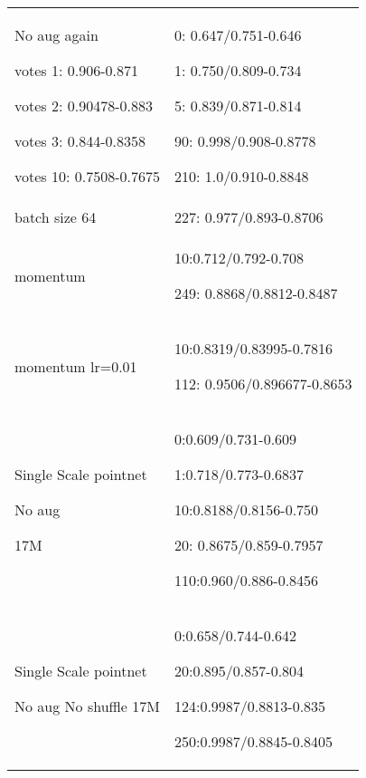 \documentclass[,table,dvipsnames]{article}
\begin{document}
\begin{tabular}{|p{10cm}|p{5.5cm}| }
	\rowcolor{orange!20}
	No aug again\par
	votes 1: 0.906-0.871\par votes 2: 0.90478-0.883\par votes 3: 0.844-0.8358\par votes 10: 0.7508-0.7675
	&0: 0.647/0.751-0.646\par 1: 0.750/0.809-0.734\par 5: 0.839/0.871-0.814\par 90: 0.998/0.908-0.8778\par 210: 1.0/0.910-0.8848
	\\

	\rowcolor{green!20}
	batch size 64 & 227: 0.977/0.893-0.8706\\
	
	\rowcolor{yellow!20}
	momentum & 10:0.712/0.792-0.708\par 249: 0.8868/0.8812-0.8487\\
	
	\rowcolor{green!20}
	momentum lr=0.01 & 10:0.8319/0.83995-0.7816\par 112: 0.9506/0.896677-0.8653\\
	
	\rowcolor{orange!20}
	Single Scale pointnet\par No aug \par 17M& 0:0.609/0.731-0.609\par 1:0.718/0.773-0.6837\par 10:0.8188/0.8156-0.750\par  20: 0.8675/0.859-0.7957 \par 110:0.960/0.886-0.8456\\
	
	\rowcolor{green!20}
	Single Scale pointnet \par No aug No shuffle 17M& 0:0.658/0.744-0.642\par 20:0.895/0.857-0.804\par 124:0.9987/0.8813-0.835\par 250:0.9987/0.8845-0.8405\\
	
	
	\hline 	
\end{tabular}
\end{document}

